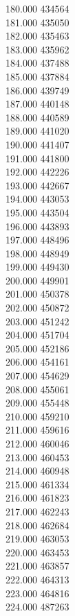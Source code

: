 { 180.000	434564 \\
 181.000	435050 \\
 182.000	435463 \\
 183.000	435962 \\
 184.000	437488 \\
 185.000	437884 \\
 186.000	439749 \\
 187.000	440148 \\
 188.000	440589 \\
 189.000	441020 \\
 190.000	441407 \\
 191.000	441800 \\
 192.000	442226 \\
 193.000	442667 \\
 194.000	443053 \\
 195.000	443504 \\
 196.000	443893 \\
 197.000	448496 \\
 198.000	448949 \\
 199.000	449430 \\
 200.000	449901 \\
 201.000	450378 \\
 202.000	450872 \\
 203.000	451242 \\
 204.000	451704 \\
 205.000	452186 \\
 206.000	454161 \\
 207.000	454629 \\
 208.000	455061 \\
 209.000	455448 \\
 210.000	459210 \\
 211.000	459616 \\
 212.000	460046 \\
 213.000	460453 \\
 214.000	460948 \\
 215.000	461334 \\
 216.000	461823 \\
 217.000	462243 \\
 218.000	462684 \\
 219.000	463053 \\
 220.000	463453 \\
 221.000	463857 \\
 222.000	464313 \\
 223.000	464816 \\
 224.000	487263 \\
}
